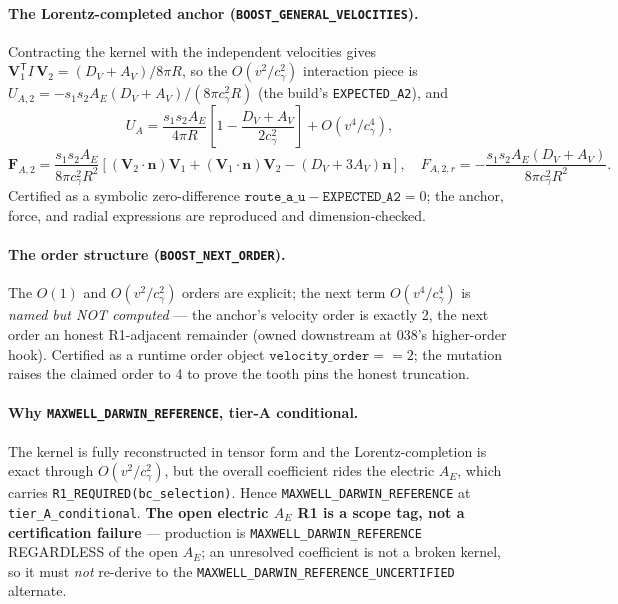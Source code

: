 \paragraph{The Lorentz-completed anchor (\texttt{BOOST\_GENERAL\_VELOCITIES}).}
Contracting the kernel with the independent velocities gives
\(\mathbf V_1^{\mathsf T}I\,\mathbf V_2=(D_V+A_V)/8\pi R\), so the
\(O(v^2/c_\gamma^2)\) interaction piece is
\(U_{A,2}=-s_1s_2A_E(D_V+A_V)/(8\pi c_\gamma^2R)\) (the build's
\texttt{EXPECTED\_A2}), and
\[
  U_A=\frac{s_1s_2A_E}{4\pi R}\!\left[1-\frac{D_V+A_V}{2c_\gamma^2}\right]
      +O(v^4/c_\gamma^4),
\]
\[
  \mathbf F_{A,2}=\frac{s_1s_2A_E}{8\pi c_\gamma^2R^2}
    \!\left[(\mathbf V_2\!\cdot\!\mathbf n)\mathbf V_1
     +(\mathbf V_1\!\cdot\!\mathbf n)\mathbf V_2-(D_V+3A_V)\mathbf n\right],\quad
  F_{A,2,r}=-\frac{s_1s_2A_E(D_V+A_V)}{8\pi c_\gamma^2R^2}.
\]
Certified as a symbolic zero-difference \(\texttt{route\_a\_u}-\texttt{EXPECTED\_A2}=0\);
the anchor, force, and radial expressions are reproduced and dimension-checked.

\paragraph{The order structure (\texttt{BOOST\_NEXT\_ORDER}).}
The \(O(1)\) and \(O(v^2/c_\gamma^2)\) orders are explicit; the next term
\(O(v^4/c_\gamma^4)\) is \emph{named but NOT computed} --- the anchor's velocity
order is exactly 2, the next order an honest R1-adjacent remainder (owned
downstream at 038's higher-order hook). Certified as a runtime order object
\(\texttt{velocity\_order}==2\); the mutation raises the claimed order to 4 to
prove the tooth pins the honest truncation.

\paragraph{Why \texttt{MAXWELL\_DARWIN\_REFERENCE}, tier-A conditional.}
The kernel is fully reconstructed in tensor form and the Lorentz-completion is
exact through \(O(v^2/c_\gamma^2)\), but the overall coefficient rides the electric
\(A_E\), which carries \texttt{R1\_REQUIRED(bc\_selection)}. Hence
\texttt{MAXWELL\_DARWIN\_REFERENCE} at \texttt{tier\_A\_conditional}. \textbf{The
open electric \(A_E\) R1 is a scope tag, not a certification failure} --- production
is \texttt{MAXWELL\_DARWIN\_REFERENCE} REGARDLESS of the open \(A_E\); an unresolved
coefficient is not a broken kernel, so it must \emph{not} re-derive to the
\texttt{MAXWELL\_DARWIN\_REFERENCE\_UNCERTIFIED} alternate.

